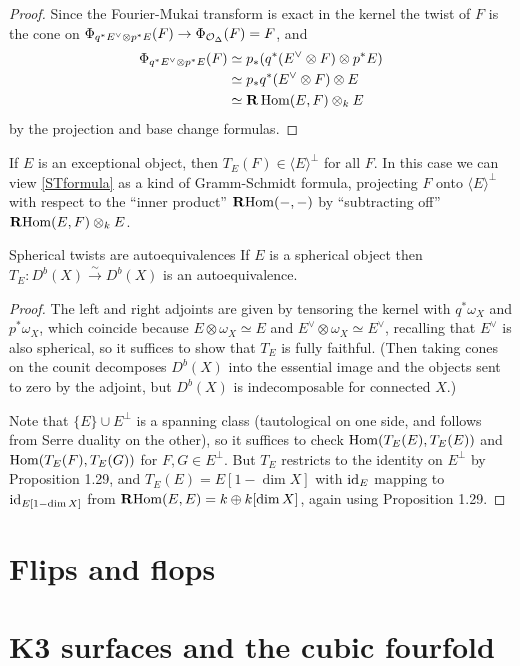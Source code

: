 \begin{proof}
    Since the Fourier-Mukai transform is exact in the kernel the twist of $F$
    is the cone on $\Phi_{q^*E^\vee\otimes p^*E}(F)\to\Phi_{\mathcal{O}_\Delta}(F)=F$,
    and
    \begin{align*}
        \Phi_{q^*E^\vee\otimes p^*E}(F)
            &\simeq p_*(q^*(E^\vee\otimes F)\otimes p^*E) \\
            &\simeq p_*q^*(E^\vee\otimes F)\otimes E \\
            &\simeq \operatorname{\mathbf{R}}\operatorname{Hom}(E,F)\otimes_kE
    \end{align*}
    by the projection and base change formulas.
\end{proof}

\begin{remark}{}{}
    If $E$ is an exceptional object, then $T_E(F)\in\langle E\rangle^\perp$ for
    all $F$. In this case we can view \eqref{STformula} as a kind of
    Gramm-Schmidt formula, projecting $F$ onto $\langle E\rangle^\perp$ with
    respect to the ``inner product'' $\operatorname{\mathbf{R}Hom}(-,-)$ by ``subtracting off''
    $\operatorname{\mathbf{R}Hom}(E,F)\otimes_kE$. %
\end{remark}

\begin{proposition}{Spherical twists are autoequivalences}{}
    If $E$ is a spherical object then $T_E:D^b(X)\xrightarrow\sim D^b(X)$ is an
    autoequivalence.
\end{proposition}

\begin{proof}
    The left and right adjoints are given by tensoring the kernel with
    $q^*\omega_X$ and $p^*\omega_X$, which coincide because
    $E\otimes\omega_X\simeq E$ and $E^\vee\otimes\omega_X\simeq E^\vee$,
    recalling that $E^\vee$ is also spherical, so it suffices to show that
    $T_E$ is fully faithful. (Then taking cones on the counit decomposes
    $D^b(X)$ into the essential image and the objects sent to zero by the
    adjoint, but $D^b(X)$ is indecomposable for connected $X$.)

    Note that $\{E\}\cup E^\perp$ is a spanning class (tautological on one side,
    and follows from Serre duality on the other), so it suffices to check
    $\operatorname{Hom}(T_E(E),T_E(E))$ and $\operatorname{Hom}(T_E(F),T_E(G))$ for $F,G\in E^\perp$. But
    $T_E$ restricts to the identity on $E^\perp$ by Proposition 1.29, and
    $T_E(E)=E[1-\dim X]$ with $\mathrm{id}_E$ mapping to $\mathrm{id}_{E[1-\dim X]}$
    from $\operatorname{\mathbf{R}Hom}(E,E)=k\oplus k[\dim X]$, again using Proposition 1.29.
\end{proof}


\section{Flips and flops}


\section{K3 surfaces and the cubic fourfold}

